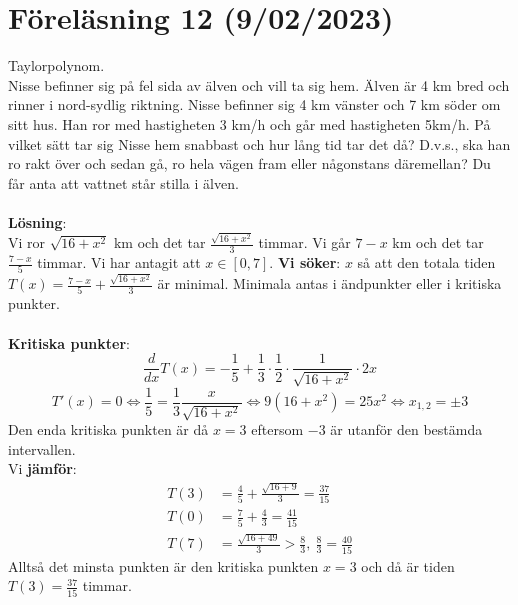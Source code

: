 \documentclass{report}
\begin{document}
\pagebreak

\section{Föreläsning 12 (9/02/2023)}
Taylorpolynom.\\

\ex{}
{
Nisse befinner sig på fel sida av älven och vill ta sig hem. Älven är 4 km bred och rinner i nord-sydlig riktning. Nisse befinner sig 4 km vänster och 7 km söder om sitt hus. Han ror med hastigheten 3 km/h och går med hastigheten 5km/h. På vilket sätt tar sig Nisse hem snabbast och hur lång tid tar det då? D.v.s., ska han ro rakt över och sedan gå, ro hela vägen fram eller någonstans däremellan? Du får anta att vattnet står stilla i älven.\\\\

\textbf{Lösning}:\\
Vi ror $ \sqrt{16+x^2}  $ km och det tar $ \frac{ \sqrt{16+x^2} }{3}   $ timmar. Vi går $ 7-x $ km och det tar $ \frac{7-x}{5}  $ timmar. Vi har antagit att $ x \in [0,7] $. \textbf{Vi söker}: $ x $ så att den totala tiden $ T(x) = \frac{7-x}{5} + \frac{ \sqrt{16+x^2} }{3}  $ är minimal. Minimala antas i ändpunkter eller i kritiska punkter.\\\\

\textbf{Kritiska punkter}:
\begin{equation*}
\frac{d}{dx}T(x) = - \frac{1}{5} + \frac{1}{3} \cdot \frac{1}{2} \cdot \frac{1}{ \sqrt{16+x^2} } \cdot 2x
\end{equation*}
\begin{equation*}
	T'(x) = 0 \iff \frac{1}{5} = \frac{1}{3} \frac{x}{ \sqrt{16+x^2} } \iff 9(16+x^2) = 25x^2 \iff x_{1,2} = \pm 3   
\end{equation*}
Den enda kritiska punkten är då $ x = 3 $ eftersom $ -3 $ är utanför den bestämda intervallen.\\
Vi \textbf{jämför}:\\
\begin{align*}
	T(3) &= \frac{4}{5} + \frac{ \sqrt{16+9} }{3} = \frac{37}{15}\\
	T(0) &= \frac{7}{5} + \frac{4}{3}  = \frac{41}{15} \\
	T(7) &= \frac{ \sqrt{16+49} }{3} > \frac{8}{3},\: \frac{8}{3} = \frac{40}{15} 
\end{align*}
Alltså det minsta punkten är den kritiska punkten $ x = 3 $ och då är tiden $ T(3) = \frac{37}{15}  $ timmar. 
}
\end{document}
